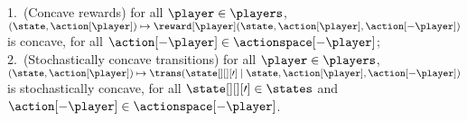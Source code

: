 

\begin{assumption}
\label{assum:concave_q}
1.~(Concave rewards) for all $\player \in \players$, $(\state, \action[\player]) \mapsto \reward[\player] (\state, \action[\player], \action[-\player])$ is concave, for all $\action[-\player] \in \actionspace[-\player]$; 
2.~(Stochastically concave transitions) for all $\player \in \players$,
$(\state, \action[\player]) \mapsto \trans (\state[][][\prime] \mid \state, \action[\player], \action[-\player])$ is stochastically concave, for all $\state[][][\prime] \in \states$ and  $\action[-\player] \in \actionspace[-\player]$.
\end{assumption}

